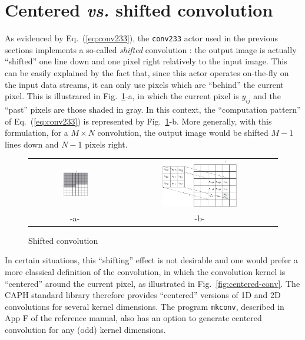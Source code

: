 \section{Centered \emph{vs.} shifted convolution}
\label{sec:slight-variation}

As evidenced by Eq.~(\ref{eq:conv233}), the \verb|conv233| actor used in the previous sections
implements a so-called \emph{shifted} convolution : the output image is actually ``shifted'' one
line down and one pixel right relatively to the input image. This can be easily explained by the
fact that, since this actor operates on-the-fly on the input data streams, it can only use pixels
which are ``behind'' the current pixel. This is illustrared in Fig.~\ref{fig:shifted-conv}-a, in
which the current pixel is $y_{ij}$ and the ``past'' pixels are those shaded in gray. In this
context, the ``computation pattern'' of Eq.~(\ref{eq:conv233}) is represented by
Fig.~\ref{fig:shifted-conv}-b.  More generally, with this formulation, for a $M\times N$
convolution, the output image would be shifted $M-1$ lines down and $N-1$ pixels right.

\begin{figure}[htbp]
  \centering
  \begin{tabular}[c]{cc}
    \includegraphics[width=0.3\textwidth]{./figs/conv-a.pdf} &
    \includegraphics[width=0.5\textwidth]{./figs/conv-b.pdf} \\
-a- & -b-
  \end{tabular}
  \caption{Shifted convolution}
  \label{fig:shifted-conv}
\end{figure}

In certain situations, this ``shifting'' effect is not desirable and one would prefer a more
classical definition of the convolution, in which the convolution kernel is ``centered'' around the
current pixel, as illustrated in Fig.~\ref{fig:centered-conv}. The CAPH standard library therefore
provides ``centered'' versions of 1D and 2D convolutions for several kernel dimensions. The program
\texttt{mkconv}, described in App F of the reference manual, also has an option to generate centered
convolution for any (odd) kernel dimensions.

